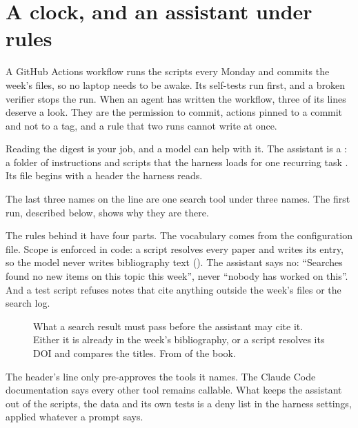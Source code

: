 \documentclass[11pt,a4paper]{article}
\begin{document}
\section{A clock, and an assistant under rules}
\label{sec:assistant}

A GitHub Actions workflow runs the scripts every Monday and commits the
week's files, so no laptop needs to be awake. Its self-tests run first, and a
broken verifier stops the run. When an agent has written the workflow, three
of its lines deserve a look. They are the permission to commit, actions
pinned to a commit and not to a tag, and a rule that two runs cannot write
at once.

Reading the digest is your job, and a model can help with it. The assistant
is a : a folder of instructions and scripts that the harness
loads for one recurring task \parencite{anthropic2026skills}. Its file begins
with a header the harness reads.



The last three names on the  line are one search tool
under three names. The first run, described below, shows why they are there.

The rules behind it have four parts. The vocabulary comes from the
configuration file. Scope is enforced in code: a script resolves every paper
and writes its entry, so the model never writes bibliography text
(). The assistant says no: ``Searches found no new
items on this topic this week'', never ``nobody has worked on this''. And a
test script refuses notes that cite anything outside the week's files or the
search log.

\begin{figure}[htbp]
\centering
{}
\caption{What a search result must pass before the assistant may cite it.
Either it is already in the week's bibliography, or a script resolves its DOI
and compares the titles. From \bkLiterature{} of the book.}
\label{fig:citationcheck}
\end{figure}

The header's  line only pre-approves the tools it names.
The Claude Code documentation says every other tool remains callable. What
keeps the assistant out of the scripts,
the data and its own tests is a deny list in the harness settings, applied
whatever a prompt says.
\end{document}
